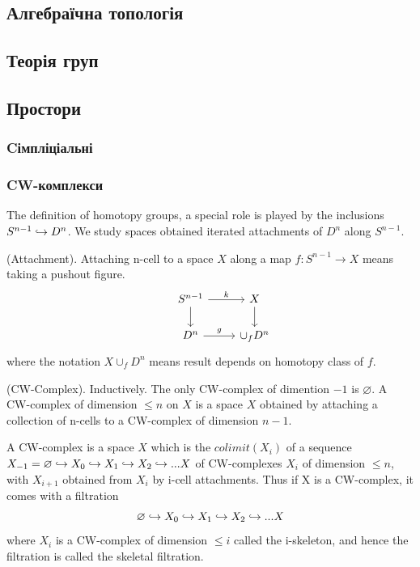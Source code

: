 \begin{definition}
\section{Алгебраїчна топологія}
\subsection{Теорія груп}
\subsection{Простори}
\subsubsection{Cімпліціальні}
\subsubsection{CW-комплекси}

The definition of homotopy groups, a special role is played
by the inclusions $S^{n-1} \hookrightarrow D^n$. We study spaces
obtained iterated attachments of $D^n$ along $S^{n-1}$.

\begin{definition} (Attachment).
Attaching n-cell to a space $X$
along a map $f : S^{n-1} \rightarrow X$ means taking a pushout figure.
$$
\begin{tikzcd}
 & S^{n-1} \arrow[r, "k"] \arrow[d, ""]
 & X \arrow[d, ""] \\
 & D^n \arrow[r, "g"] & \cup_f D^n
\end{tikzcd}
$$
where the notation $X \cup_f D^n$ means result depends
on homotopy class of $f$.
\end{definition}

\begin{definition} (CW-Complex).
Inductively. The only CW-complex of dimention $-1$ is $\varnothing$.
A CW-complex of dimension $\leqslant n$ on $X$ is a
space $X$ obtained by attaching a collection of n-cells
to a CW-complex of dimension $n-1$.

A CW-complex is a space $X$ which is the $colimit(X_i)$ of a
sequence $X_{-1} = \varnothing \hookrightarrow X_0 \hookrightarrow X_1 \hookrightarrow X_2 \hookrightarrow ... X$ of
CW-complexes $X_i$ of dimension $\leqslant n$, with $X_{i+1}$
obtained from $X_i$ by i-cell attachments.
Thus if X is a CW-complex, it comes with a filtration
$$
    \varnothing \hookrightarrow X_0 \hookrightarrow X_1 \hookrightarrow X_2 \hookrightarrow ... X
$$
where $X_i$ is a CW-complex of dimension $\leqslant i$ called
the i-skeleton, and hence the filtration is called the skeletal
filtration.
\end{definition}


\end{definition}
